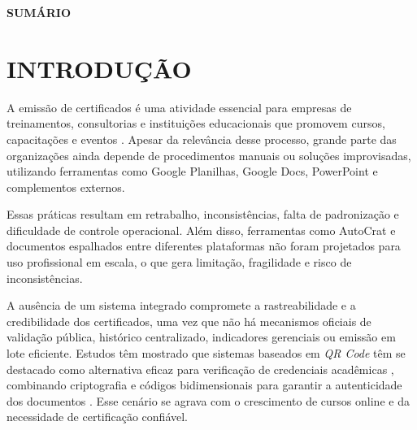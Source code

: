 \documentclass[12pt,openright,oneside,a4paper]{article}
\renewcommand{\contentsname}{SUMÁRIO}
\renewcommand{\headrulewidth}{0pt}
\renewcommand{\headrulewidth}{0pt}
\renewcommand{\headrulewidth}{0pt}
\newcounter{rn}
\begin{document}
\newpage
\thispagestyle{pretextual}

\newpage
\thispagestyle{pretextual}
\listoftables

\newpage
\thispagestyle{pretextual}


\newpage
\thispagestyle{pretextual}
\bgroup
\renewcommand{\contentsname}{}
\begin{center}
\textbf{SUMÁRIO}
\end{center}
\tableofcontents
\egroup
\newpage

\renewcommand{\thepage}{\arabic{page}}
\pagestyle{fancy}
\fancyhf{}
\fancyhead[R]{\thepage}
\renewcommand{\headrulewidth}{0pt}
\thispagestyle{fancy}

\section{INTRODUÇÃO}

A emissão de certificados é uma atividade essencial para empresas de treinamentos, consultorias e instituições educacionais que promovem cursos, capacitações e eventos \cite{rahman2026,kulkarni2025}. Apesar da relevância desse processo, grande parte das organizações ainda depende de procedimentos manuais ou soluções improvisadas, utilizando ferramentas como Google Planilhas, Google Docs, PowerPoint e complementos externos.

Essas práticas resultam em retrabalho, inconsistências, falta de padronização e dificuldade de controle operacional. Além disso, ferramentas como AutoCrat \cite{autocrat2025} e documentos espalhados entre diferentes plataformas não foram projetados para uso profissional em escala, o que gera limitação, fragilidade e risco de inconsistências.

A ausência de um sistema integrado compromete a rastreabilidade e a credibilidade dos certificados, uma vez que não há mecanismos oficiais de validação pública, histórico centralizado, indicadores gerenciais ou emissão em lote eficiente. Estudos têm mostrado que sistemas baseados em \textit{QR Code} têm se destacado como alternativa eficaz para verificação de credenciais acadêmicas \cite{rahman2026}, combinando criptografia e códigos bidimensionais para garantir a autenticidade dos documentos \cite{wellem2021}. Esse cenário se agrava com o crescimento de cursos online e da necessidade de certificação confiável.
\end{document}

